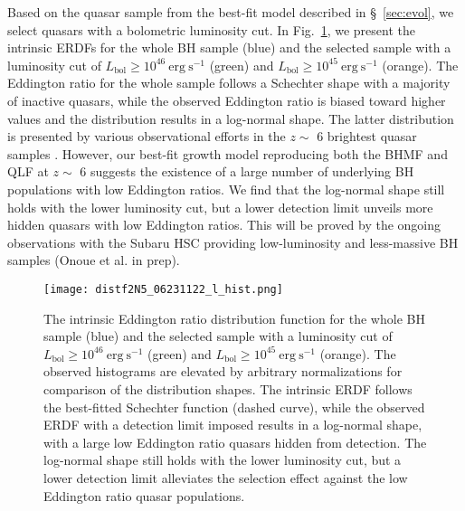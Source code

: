 \documentclass[twocolumn, twocolappendix]{aastex63}
\newcommand{\Lbol}{L_\mathrm{bol}}
\begin{document}
\begin{CJK*}{UTF8}{gbsn}
Based on the quasar sample from the best-fit model described in \S~\ref{sec:evol}, 
we select quasars with a bolometric luminosity cut.
In Fig.~\ref{fig:lhist}, we present the intrinsic ERDFs for the whole BH sample (blue) and the selected sample with
a luminosity cut of $\Lbol \geq 10^{46}~\mathrm{erg~s^{-1}}$ (green) and $\Lbol \geq 10^{45}~\mathrm{erg~s^{-1}}$ (orange).  
The Eddington ratio for the whole sample follows a Schechter shape with a majority of inactive quasars, 
while the observed Eddington ratio is biased toward higher values and the distribution results in a log-normal shape. 
The latter distribution is presented by various observational efforts in the $z\sim$ 6 brightest quasar samples 
\citep[e.g.,][]{2010AJ....140..546W,2019ApJ...873...35S}.
However, our best-fit growth model reproducing both the BHMF and QLF at $z\sim$ 6 suggests the existence of
a large number of underlying BH populations with low Eddington ratios. 
We find that the log-normal shape still holds with the lower luminosity cut, 
but a lower detection limit unveils more hidden quasars with low Eddington ratios. 
This will be proved by the ongoing observations with the Subaru HSC providing low-luminosity and less-massive BH samples
(Onoue et al. in prep).



\begin{figure}
\centering
\texttt{[image: distf2N5\_06231122\_l\_hist.png]}
\caption{
The intrinsic Eddington ratio distribution function for the whole BH sample (blue) and the selected sample with
a luminosity cut of $\Lbol \geq 10^{46}~\mathrm{erg~s^{-1}}$ (green) and $\Lbol \geq 10^{45}~\mathrm{erg~s^{-1}}$ (orange).  
The observed histograms are elevated by arbitrary normalizations for comparison of the distribution shapes.
The intrinsic ERDF follows the best-fitted Schechter function (dashed curve), 
while the observed ERDF with a detection limit imposed results in a log-normal shape, 
with a large low Eddington ratio quasars hidden from detection.
The log-normal shape still holds with the lower luminosity cut, 
but a lower detection limit alleviates the selection effect against the low Eddington ratio quasar populations.
}
\label{fig:lhist}
\end{figure}
  



\end{CJK*}
\end{document}
